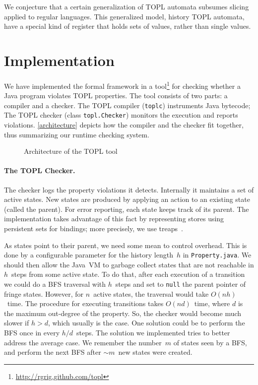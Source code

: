 \documentclass{article} %
\theoremstyle{definition}
\theoremstyle{remark}
\begin{document}
We conjecture that a certain generalization of TOPL automata subsumes slicing applied to regular languages.
This generalized model, history TOPL automata, have a special kind of register that holds sets of values, rather than single values.

\section{Implementation} \label{sec:implementation} %
We have implemented the formal framework in a tool\footnote{\url{http://rgrig.github.com/topl}} for checking whether a Java program violates 
TOPL properties.
The tool consists of two parts: a compiler and a checker.
The TOPL compiler ({\tt toplc}) instruments Java bytecode;
The TOPL checker (class {\tt topl.Checker}) monitors the execution and reports violations.
\autoref{architecture} depicts how the compiler and the checker fit together, thus summarizing our runtime checking system.

\begin{figure}[t]
\begin{center}

\caption{Architecture of the TOPL tool}
\label{architecture}
\end{center}
\end{figure}

\paragraph{The TOPL Checker.} %
The checker logs the property violations it detects. 
Internally it  maintains a set of active states.
New states are  produced by applying an action to an existing state (called the parent).
For error reporting, each state keeps track of its parent.
The implementation takes advantage of this fact by representing stores
using persistent sets for bindings;  more precisely, we use treaps~\cite{DBLP:conf/focs/AragonS89}.

As states point to their parent, we need some mean to control overhead.  This is done by a configurable parameter for  the history length~$h$ in {\tt Property.java}.
We should then allow the Java~VM to garbage collect states that are not reachable in $h$~steps from some active state.
To do that, after each execution of a transition we could do a BFS traversal with $h$~steps and set to {\tt null} the parent pointer of fringe states.
However, for $n$~active states, the traversal would take $O(nh)$~time.
The procedure for executing transitions takes $O(nd)$~time, where $d$ is the maximum out-degree of the property.
So, the checker would become much slower if $h>d$, which usually is the case.
%
One solution could be to perform the BFS once in every $h/d$~steps.
The solution we implemented tries to better address the average case.
We remember the number~$m$ of states seen by a BFS, and perform the next BFS after $\sim m$~new states were created.
\end{document}
